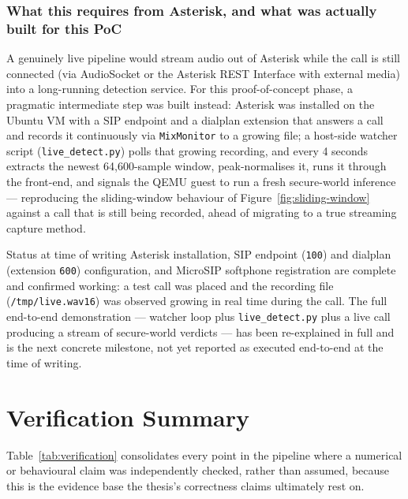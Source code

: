 \documentclass[11pt,a4paper]{report}
\newcommand{\code}[1]{\texttt{\small #1}}
\begin{document}
\subsection{What this requires from Asterisk, and what was actually built for this PoC}

A genuinely live pipeline would stream audio out of Asterisk while the call is still connected
(via AudioSocket or the Asterisk REST Interface with external media) into a long-running detection
service. For this proof-of-concept phase, a pragmatic intermediate step was built instead: Asterisk
was installed on the Ubuntu VM with a SIP endpoint and a dialplan extension that answers a call and
records it continuously via \code{MixMonitor} to a growing file; a host-side watcher script
(\code{live\_detect.py}) polls that growing recording, and every 4 seconds extracts the newest
64,600-sample window, peak-normalises it, runs it through the front-end, and signals the QEMU guest
to run a fresh secure-world inference --- reproducing the sliding-window behaviour of
Figure~\ref{fig:sliding-window} against a call that is still being recorded, ahead of migrating to a
true streaming capture method.

\begin{resolvedbox}{Status at time of writing}
Asterisk installation, SIP endpoint (\code{100}) and dialplan (extension \code{600}) configuration,
and MicroSIP softphone registration are complete and confirmed working: a test call was placed and
the recording file (\code{/tmp/live.wav16}) was observed growing in real time during the call. The
full end-to-end demonstration --- watcher loop plus \code{live\_detect.py} plus a live call
producing a stream of secure-world verdicts --- has been re-explained in full and is the next
concrete milestone, not yet reported as executed end-to-end at the time of writing.
\end{resolvedbox}

\chapter{Verification Summary}

Table~\ref{tab:verification} consolidates every point in the pipeline where a numerical or
behavioural claim was independently checked, rather than assumed, because this is the evidence base
the thesis's correctness claims ultimately rest on.
\end{document}
